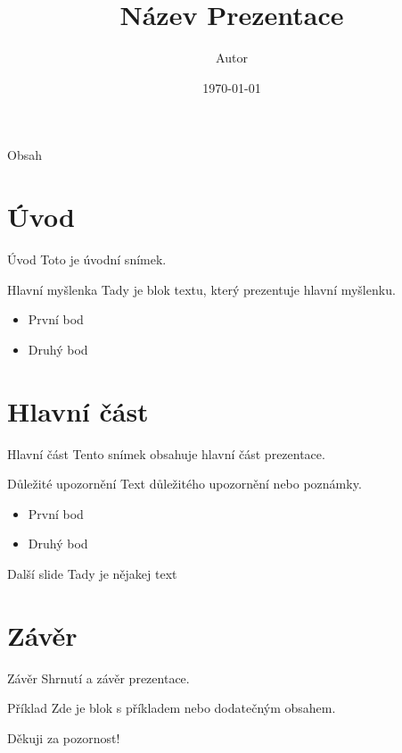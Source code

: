 \documentclass[aspectratio=169]{beamer}
\title{Název Prezentace}
\author{Autor}
\institute{Instituce}
\date{\today}
\begin{document}
\begin{frame}
    \titlepage
\end{frame}

\begin{frame}{Obsah}
    \tableofcontents
\end{frame}

\section{Úvod}
\begin{frame}{Úvod}
    Toto je úvodní snímek.
    \begin{block}{Hlavní myšlenka}
        Tady je blok textu, který prezentuje hlavní myšlenku.
    \end{block}
    \begin{itemize}
        \item První bod
        \item Druhý bod
    \end{itemize}
\end{frame}

\section{Hlavní část}
\begin{frame}{Hlavní část}
    Tento snímek obsahuje hlavní část prezentace.
    \begin{alertblock}{Důležité upozornění}
        Text důležitého upozornění nebo poznámky.
    \end{alertblock}
    \begin{itemize}
        \item První bod
        \item Druhý bod
    \end{itemize}
\end{frame}

\begin{frame}[fragile]{Další slide}
 Tady  je nějakej text
\end{frame}


\section{Závěr}
\begin{frame}{Závěr}
    Shrnutí a závěr prezentace.
    \begin{exampleblock}{Příklad}
        Zde je blok s příkladem nebo dodatečným obsahem.
    \end{exampleblock}
\end{frame}

\begin{frame}
    \centering
    \Huge Děkuji za pozornost!
\end{frame}
\end{document}
